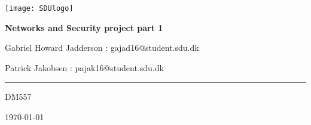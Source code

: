 \begin{titlepage}
	\centering
	\texttt{[image: SDUlogo]}\par\vspace{0.5cm} %
	{\huge\bfseries Networks and Security project part 1\par}
	\vspace{0.5cm}
	{\small Gabriel Howard Jadderson : gajad16@student.sdu.dk\par}
	{\small Patrick Jakobsen : pajak16@student.sdu.dk\par}
  {\rule{10.0cm}{0.1mm}\par}
	{\small DM557\par}
	{\small \today\par}
	\vspace{1cm}
\end{titlepage}

